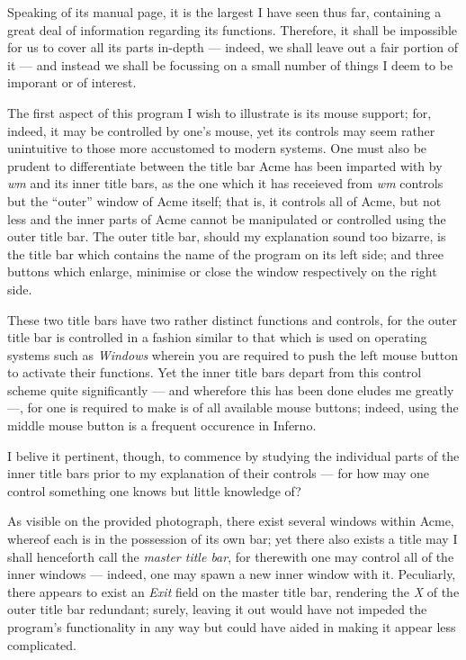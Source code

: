 \documentclass[a5paper,twoside,12pt]{report}
\begin{document}
   Speaking of its manual page, it is the largest I have seen thus far, containing a great deal of information regarding its functions. Therefore, it shall be impossible for us to cover all its parts in-depth — indeed, we shall leave out a fair portion of it — and instead we shall be focussing on a small number of things I deem to be imporant or of interest.

   The first aspect of this program I wish to illustrate is its mouse support; for, indeed, it may be controlled by one's mouse, yet its controls may seem rather unintuitive to those more accustomed to modern systems. One must also be prudent to differentiate between the title bar Acme has been imparted with by \textit{wm} and its inner title bars, as the one which it has receieved from \textit{wm} controls but the ``outer'' window of Acme itself; that is, it controls all of Acme, but not less and the inner parts of Acme cannot be manipulated or controlled using the outer title bar. The outer title bar, should my explanation sound too bizarre, is the title bar which contains the name of the program on its left side; and three buttons which enlarge, minimise or close the window respectively on the right side.

   These two title bars have two rather distinct functions and controls, for the outer title bar is controlled in a fashion similar to that which is used on operating systems such as \textit{Windows} wherein you are required to push the left mouse button to activate their functions. Yet the inner title bars depart from this control scheme quite significantly — and wherefore this has been done eludes me greatly —, for one is required to make is of all available mouse buttons; indeed, using the middle mouse button is a frequent occurence in Inferno.

   I belive it pertinent, though, to commence by studying the individual parts of the inner title bars prior to my explanation of their controls — for how may one control something one knows but little knowledge of?

  As visible on the provided photograph, there exist several windows within Acme, whereof each is in the possession of its own bar; yet there also exists a title may I shall henceforth call the \textit{master title bar}, for therewith one may control all of the inner windows — indeed, one may spawn a new inner window with it. Peculiarly, there appears to exist an \textit {Exit} field on the master title bar, rendering the \textit{X} of the outer title bar redundant; surely, leaving it out would have not impeded the program's functionality in any way but could have aided in making it appear less complicated.
\end{document}
